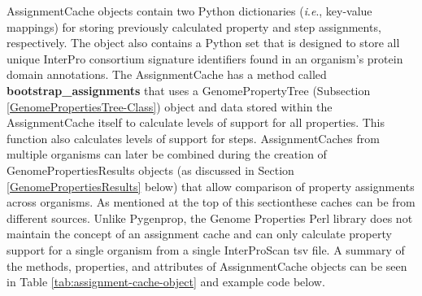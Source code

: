 AssignmentCache objects contain two Python dictionaries (\textit{i}.\textit{e}., 
key-value mappings) for storing previously calculated property and step 
assignments, respectively. The object also contains a Python set that is 
designed to store all unique InterPro consortium signature identifiers found in 
an organism's protein domain annotations. The AssignmentCache has a method 
called \textbf{bootstrap\_assignments} that uses a GenomePropertyTree 
(Subsection \ref{GenomePropertiesTree-Class}) object and data stored within 
the AssignmentCache itself to calculate levels of support for all properties. This function also 
calculates levels of support for steps. AssignmentCaches from multiple organisms 
can later be combined during the creation of GenomePropertiesResults objects (as 
discussed in Section \ref{GenomePropertiesResults} below) that allow comparison 
of property assignments across organisms. As mentioned at the top of this 
sectionthese caches can be from different sources. Unlike Pygenprop, the Genome 
Properties Perl library does not maintain the concept of an assignment cache and 
can only calculate property support for a single organism from a single 
InterProScan \gls{tsv} file. A summary of the methods, properties, and 
attributes of AssignmentCache objects can be seen in Table 
\ref{tab:assignment-cache-object} and example code below.

